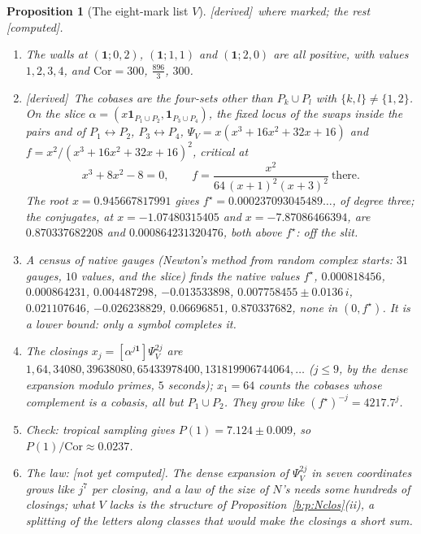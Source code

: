 \documentclass[11pt]{article}
\newcommand{\one}{\mathbf 1}
\theoremstyle{plain}
\newtheorem{proposition}{Proposition}[section]
\theoremstyle{definition}
\theoremstyle{remark}
\newcommand{\derived}{\textup{[derived]}}
\newcommand{\computed}{\textup{[computed]}}
\newcommand{\notyet}{\textup{[not yet computed]}}
\begin{document}
\begin{proposition}[The eight-mark list $V$]\label{b:p:V}\derived\ where marked; the rest \computed.\
\begin{enumerate}[label=(\roman*)]
\item The walls at $(\one;0,2)$, $(\one;1,1)$ and $(\one;2,0)$ are all positive, with values $1,2,3,4$, and $\mathrm{Cor}=300$, $\frac{896}3$, $300$.
\item \derived\ The cobases are the four-sets other than $P_k\cup P_l$ with $\{k,l\}\neq\{1,2\}$. On the slice $\alpha=(x\one_{P_1\cup P_2},\one_{P_3\cup P_4})$, the fixed locus of the swaps inside the pairs and of $P_1\leftrightarrow P_2$, $P_3\leftrightarrow P_4$, $\Psi_V=x(x^3+16x^2+32x+16)$ and $f=x^2/(x^3+16x^2+32x+16)^2$, critical at
\[
x^3+8x^2-8=0,\qquad f=\frac{x^2}{64\,(x+1)^2(x+3)^2}\ \text{there}.
\]
The root $x=0.945667817991$ gives $f^\star=0.000237093045489\ldots$, of degree three; the conjugates, at $x=-1.07480315405$ and $x=-7.87086466394$, are $0.870337682208$ and $0.000864231320476$, both above $f^\star$: off the slit.
\item A census of native gauges (Newton's method from random complex starts: $31$ gauges, $10$ values, and the slice) finds the native values $f^\star$, $0.000818456$, $0.000864231$, $0.004487298$, $-0.013533898$, $0.007758455\pm0.0136\,i$, $0.021107646$, $-0.026238829$, $0.06696851$, $0.870337682$, none in $(0,f^\star)$. It is a lower bound: only a symbol completes it.
\item The closings $x_j=[\alpha^{j\one}]\Psi_V^{2j}$ are $1,64,34080,39638080,65433978400,131819906744064,\dots$ ($j\le9$, by the dense expansion modulo primes, $5$ seconds); $x_1=64$ counts the cobases whose complement is a cobasis, all but $P_1\cup P_2$. They grow like $(f^\star)^{-j}=4217.7^j$.
\item Check: tropical sampling gives $P(1)=7.124\pm0.009$, so $P(1)/\mathrm{Cor}\approx0.0237$.
\item The law: \notyet. The dense expansion of $\Psi_V^{2j}$ in seven coordinates grows like $j^7$ per closing, and a law of the size of $N$'s needs some hundreds of closings; what $V$ lacks is the structure of Proposition~\ref{b:p:Nclos}(ii), a splitting of the letters along classes that would make the closings a short sum.
\end{enumerate}
\end{proposition}
\end{document}
